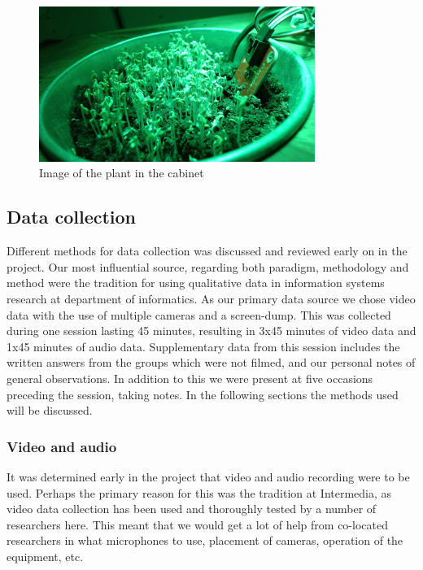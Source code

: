 \begin{figure}
\centering
\includegraphics[width=0.8\textwidth]{img/empiricalsetting/cupboardsystem.jpg}
\caption{Image of the plant in the cabinet}
\label{fig:cabinetsystemplant}
\end{figure}


\subsection{Data collection}
Different methods for data collection was discussed and reviewed early on in the project. Our most influential source, regarding both paradigm, methodology and method were the tradition for using qualitative data in information systems research at department of informatics. As our primary data source we chose video data with the use of multiple cameras and a screen-dump. This was collected during one session lasting 45 minutes, resulting in 3x45 minutes of video data and 1x45 minutes of audio data. Supplementary data from this session includes the written answers from the groups which were not filmed, and our personal notes of general observations. In addition to this we were present at five occasions preceding the session, taking notes. In the following sections the methods used will be discussed. 

\subsubsection{Video and audio}
It was determined early in the project that video and audio recording were to be used. Perhaps the primary reason for this was the tradition at Intermedia, as video data collection has been used and thoroughly tested by a number of researchers here. This meant that we would get a lot of help from co-located researchers in what microphones to use, placement of cameras, operation of the equipment, etc. 

